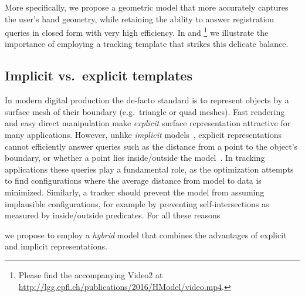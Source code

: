 More specifically, we propose a geometric model that more accurately captures the user's hand geometry, while retaining the ability to answer registration queries in closed form with very high efficiency. In  and 
\VideoHTrack{}  \footnote{Please find the accompanying Video2 at \url{http://lgg.epfl.ch/publications/2016/HModel/video.mp4}.} we illustrate the importance of employing a tracking template that strikes this delicate balance.

\subsection*{Implicit vs.\ explicit templates}
In modern digital production the de-facto standard is to represent objects by a surface mesh of their boundary (e.g.\ triangle or quad meshes). Fast rendering and easy direct manipulation make \emph{explicit} surface representation attractive for many applications.
%
However, unlike \emph{implicit} models~\cite{bloomenthal1997book}, explicit representations cannot efficiently answer queries such as the distance from a point to the object's boundary, or whether a point lies inside/outside the model~\cite[Ch.1]{botsch2010polygon}. In tracking applications these queries play a fundamental role, as the optimization attempts to find configurations where the average distance from model to data is minimized. Similarly, a tracker should prevent the model from assuming implausible configurations, for example by preventing self-intersections as measured by inside/outside predicates. For all these reasons 

 we propose to employ a \emph{hybrid} model that combines the advantages of explicit and implicit representations.


